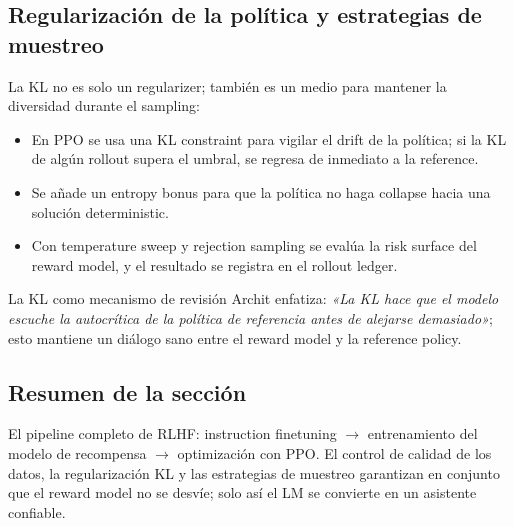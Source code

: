 \subsection{Regularización de la política y estrategias de muestreo}

La KL no es solo un regularizer; también es un medio para mantener la diversidad durante el sampling:
\begin{itemize}
    \item En PPO se usa una KL constraint para vigilar el drift de la política; si la KL de algún rollout supera el umbral, se regresa de inmediato a la reference.
    \item Se añade un entropy bonus para que la política no haga collapse hacia una solución deterministic.
    \item Con temperature sweep y rejection sampling se evalúa la risk surface del reward model, y el resultado se registra en el rollout ledger.
\end{itemize}

\begin{importantbox}{La KL como mecanismo de revisión}
Archit enfatiza: \textit{«La KL hace que el modelo escuche la autocrítica de la política de referencia antes de alejarse demasiado»}; esto mantiene un diálogo sano entre el reward model y la reference policy.
\end{importantbox}

\subsection{Resumen de la sección}

El pipeline completo de RLHF: instruction finetuning $\to$ entrenamiento del modelo de recompensa $\to$ optimización con PPO. El control de calidad de los datos, la regularización KL y las estrategias de muestreo garantizan en conjunto que el reward model no se desvíe; solo así el LM se convierte en un asistente confiable.

